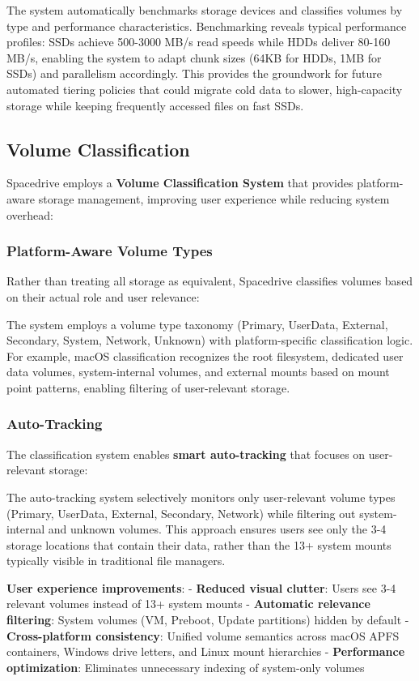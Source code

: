 \documentclass[sigconf]{acmart}
\begin{document}
The system automatically benchmarks storage devices and classifies volumes by type and performance characteristics. Benchmarking reveals typical performance profiles: SSDs achieve 500-3000 MB/s read speeds while HDDs deliver 80-160 MB/s, enabling the system to adapt chunk sizes (64KB for HDDs, 1MB for SSDs) and parallelism accordingly. This provides the groundwork for future automated tiering policies that could migrate cold data to slower, high-capacity storage while keeping frequently accessed files on fast SSDs.


\subsection{Volume Classification}
Spacedrive employs a \textbf{Volume Classification System} that provides platform-aware storage management, improving user experience while reducing system overhead:

\subsubsection{Platform-Aware Volume Types}
Rather than treating all storage as equivalent, Spacedrive classifies volumes based on their actual role and user relevance:

The system employs a volume type taxonomy (Primary, UserData, External, Secondary, System, Network, Unknown) with platform-specific classification logic. For example, macOS classification recognizes the root filesystem, dedicated user data volumes, system-internal volumes, and external mounts based on mount point patterns, enabling filtering of user-relevant storage.

\subsubsection{Auto-Tracking}
The classification system enables \textbf{smart auto-tracking} that focuses on user-relevant storage:

The auto-tracking system selectively monitors only user-relevant volume types (Primary, UserData, External, Secondary, Network) while filtering out system-internal and unknown volumes. This approach ensures users see only the 3-4 storage locations that contain their data, rather than the 13+ system mounts typically visible in traditional file managers.

\textbf{User experience improvements}:
- \textbf{Reduced visual clutter}: Users see 3-4 relevant volumes instead of 13+ system mounts
- \textbf{Automatic relevance filtering}: System volumes (VM, Preboot, Update partitions) hidden by default
- \textbf{Cross-platform consistency}: Unified volume semantics across macOS APFS containers, Windows drive letters, and Linux mount hierarchies
- \textbf{Performance optimization}: Eliminates unnecessary indexing of system-only volumes
\end{document}
